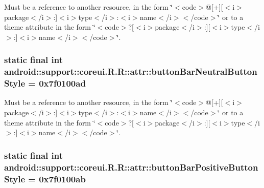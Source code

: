 Must be a reference to another resource, in the form \char`\"{}$<$code$>$@\mbox{[}+\mbox{]}\mbox{[}$<$i$>$package$<$/i$>$:\mbox{]}$<$i$>$type$<$/i$>$:$<$i$>$name$<$/i$>$$<$/code$>$\char`\"{} or to a theme attribute in the form \char`\"{}$<$code$>$?\mbox{[}$<$i$>$package$<$/i$>$:\mbox{]}\mbox{[}$<$i$>$type$<$/i$>$:\mbox{]}$<$i$>$name$<$/i$>$$<$/code$>$\char`\"{}. \hypertarget{classandroid_1_1support_1_1coreui_1_1_r_1_1attr_dbc0c807cabdfeea1a5c2dd2f1120f67}{
\subsubsection[{buttonBarNeutralButtonStyle}]{\setlength{\rightskip}{0pt plus 5cm}static final int android::support::coreui.R.R::attr::buttonBarNeutralButtonStyle = 0x7f0100ad}}
\label{classandroid_1_1support_1_1coreui_1_1_r_1_1attr_dbc0c807cabdfeea1a5c2dd2f1120f67}


Must be a reference to another resource, in the form \char`\"{}$<$code$>$@\mbox{[}+\mbox{]}\mbox{[}$<$i$>$package$<$/i$>$:\mbox{]}$<$i$>$type$<$/i$>$:$<$i$>$name$<$/i$>$$<$/code$>$\char`\"{} or to a theme attribute in the form \char`\"{}$<$code$>$?\mbox{[}$<$i$>$package$<$/i$>$:\mbox{]}\mbox{[}$<$i$>$type$<$/i$>$:\mbox{]}$<$i$>$name$<$/i$>$$<$/code$>$\char`\"{}. \hypertarget{classandroid_1_1support_1_1coreui_1_1_r_1_1attr_4851a722037dee721893335b758a70b1}{
\subsubsection[{buttonBarPositiveButtonStyle}]{\setlength{\rightskip}{0pt plus 5cm}static final int android::support::coreui.R.R::attr::buttonBarPositiveButtonStyle = 0x7f0100ab}}
\label{classandroid_1_1support_1_1coreui_1_1_r_1_1attr_4851a722037dee721893335b758a70b1}


